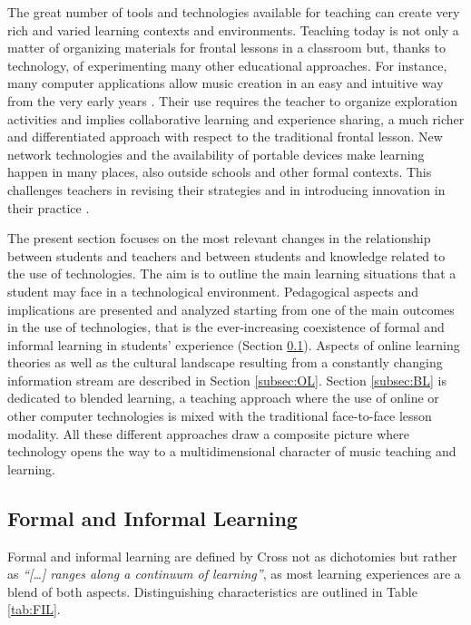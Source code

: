 \documentclass[journal]{IEEEtran}
\begin{document}
The great number of tools and technologies available for teaching can create very rich and varied learning contexts and environments. Teaching today is not only a matter of organizing materials for frontal lessons in a classroom but, thanks to technology, of experimenting many other educational approaches. For instance, many computer applications allow music creation in an easy and intuitive way from the very early years \cite{farbood2004hyperscore, jennings2007composing, mcdowall2003music}. Their use requires the teacher to organize exploration activities and implies collaborative learning and experience sharing, a much richer and differentiated approach with respect to the traditional frontal lesson. 
New network technologies and the availability of portable devices make learning happen in many places, also outside schools and other formal contexts. This challenges teachers in revising their strategies and in introducing innovation in their practice \cite{de2014learning}. 

The present section focuses on the most relevant changes in the relationship between students and teachers and between students and knowledge related to the use of technologies. The aim is to outline the main learning situations that a student may face in a technological environment. Pedagogical aspects and implications are presented and analyzed starting from one of the main outcomes in the use of technologies, that is the ever-increasing coexistence of formal and informal learning in students' experience (Section \ref{subsec:FIL}). Aspects of online learning theories as well as the cultural landscape resulting from a constantly changing information stream are described in Section \ref{subsec:OL}. Section \ref{subsec:BL} is dedicated to blended learning, a teaching approach where the use of online or other computer technologies is mixed with the traditional face-to-face lesson modality. 
All these different approaches draw a composite picture where technology opens the way to a multidimensional character of music teaching and learning. 

\subsection{Formal and Informal Learning} \label{subsec:FIL}
Formal and informal learning are defined by Cross \cite[p. 12]{cross2011informal} not as dichotomies but rather as \textit{``[\ldots] ranges along a continuum of learning''}, as most learning experiences are a blend of both aspects. Distinguishing characteristics are outlined in Table \ref{tab:FIL}. 
\end{document}
